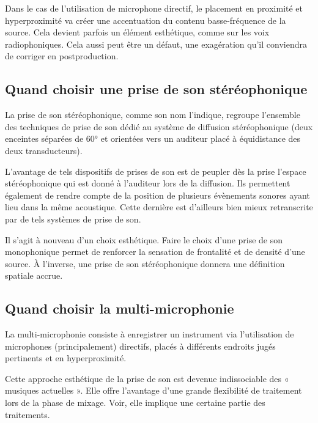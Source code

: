 \documentclass[
  letterpaper,
  DIV=11,
  numbers=noendperiod]{scrreprt}
\begin{document}
Dans le cas de l'utilisation de microphone directif, le placement en
proximité et hyperproximité va créer une accentuation du contenu
basse-fréquence de la source. Cela devient parfois un élément
esthétique, comme sur les voix radiophoniques. Cela aussi peut être un
défaut, une exagération qu'il conviendra de corriger en postproduction.

\hypertarget{quand-choisir-une-prise-de-son-stuxe9ruxe9ophonique}{%
\subsection{Quand choisir une prise de son
stéréophonique}\label{quand-choisir-une-prise-de-son-stuxe9ruxe9ophonique}}

La prise de son stéréophonique, comme son nom l'indique, regroupe
l'ensemble des techniques de prise de son dédié au système de diffusion
stéréophonique (deux enceintes séparées de 60° et orientées vers un
auditeur placé à équidistance des deux transducteurs).

L'avantage de tels dispositifs de prises de son est de peupler dès la
prise l'espace stéréophonique qui est donné à l'auditeur lors de la
diffusion. Ils permettent également de rendre compte de la position de
plusieurs évènements sonores ayant lieu dans la même acoustique. Cette
dernière est d'ailleurs bien mieux retranscrite par de tels systèmes de
prise de son.

Il s'agit à nouveau d'un choix esthétique. Faire le choix d'une prise de
son monophonique permet de renforcer la sensation de frontalité et de
densité d'une source. À l'inverse, une prise de son stéréophonique
donnera une définition spatiale accrue.

\hypertarget{quand-choisir-la-multi-microphonie}{%
\subsection{Quand choisir la
multi-microphonie}\label{quand-choisir-la-multi-microphonie}}

La multi-microphonie consiste à enregistrer un instrument via
l'utilisation de microphones (principalement) directifs, placés à
différents endroits jugés pertinents et en hyperproximité.

Cette approche esthétique de la prise de son est devenue indissociable
des « musiques actuelles ». Elle offre l'avantage d'une grande
flexibilité de traitement lors de la phase de mixage. Voir, elle
implique une certaine partie des traitements.
\end{document}
